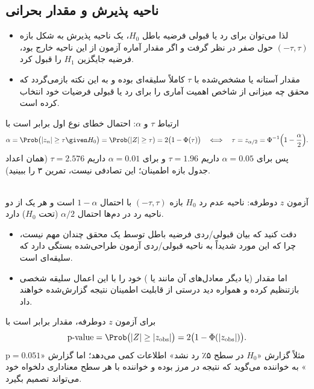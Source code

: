 \subsection{ناحیه پذیرش و مقدار بحرانی}
\begin{itemize}
\item لذا می‌توان برای رد یا قبولی فرضیه باطل $H_0$، یک ناحیه پذیرش به شکل بازه $(-\tau,\tau)$ حول صفر در نظر گرفت و اگر مقدار آماره آزمون از این ناحیه خارج بود، فرضیه جایگزین $H_1$ را قبول کرد.
\item مقدار آستانه یا  مشخص‌شده با $\tau$ کاملاً سلیقه‌ای بوده و به این نکته بازمی‌گردد که محقق  چه میزانی از شاخص اهمیت آماری  را برای رد یا قبولی فرضیات خود انتخاب کرده است.
\end{itemize}
ارتباط $\tau$ و $\alpha$: احتمال خطای نوع اول برابر است با
\[
\alpha=\Prob\big(|z_n|\ge\tau\given H_0\big)=\Prob(|Z|\ge\tau)=2\big(1-\Phi(\tau)\big)
\quad\Longleftrightarrow\quad
\tau=z_{\alpha/2}=\Phi^{-1}\Big(1-\frac\alpha2\Big).
\]
پس برای $\alpha=0.05$ داریم $\tau=1.96$ و برای $\alpha=0.01$ داریم $\tau=2.576$ (همان اعداد جدول بازه اطمینان؛ این تصادفی نیست، تمرین ۳ را ببینید).

\begin{center}
\begin{tikzpicture}
\end{tikzpicture}\\
{\small آزمون $z$ دوطرفه: ناحیه عدم رد $H_0$ بازه $(-\tau,\tau)$ با احتمال $1-\alpha$ است و هر یک از دو ناحیه رد در دم‌ها احتمال $\alpha/2$ (تحت $H_0$) دارد.}
\end{center}

\begin{itemize}
\item دقت کنید که بیان قبولی/ردی فرضیه باطل توسط یک محقق چندان مهم نیست، چرا که این مورد شدیداً به ناحیه قبولی/ردی آزمون طراحی‌شده بستگی دارد که سلیقه‌ای است.
\item اما مقدار  (یا دیگر معادل‌های آن مانند  یا ) خود را با این اعمال سلیقه شخصی بازتنظیم کرده و همواره دید درستی از قابلیت اطمینان نتیجه گزارش‌شده خواهند داد.
\end{itemize}
برای آزمون $z$ دوطرفه، مقدار  برابر است با
\[
\text{p-value}=\Prob\big(|Z|\ge|z_{\text{obs}}|\big)=2\big(1-\Phi(|z_{\text{obs}}|)\big).
\]
مثلاً گزارش «$H_0$ در سطح ۵٪ رد نشد» اطلاعات کمی می‌دهد؛ اما گزارش «$\text{p}=0.051$» به خواننده می‌گوید که نتیجه در مرز بوده و خواننده با هر سطح معناداری دلخواه خود می‌تواند تصمیم بگیرد.

